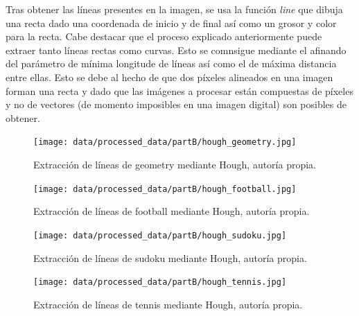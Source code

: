\documentclass[a4paper,12pt]{article}
\begin{document}
{\vspace{0.5cm}

Tras obtener las líneas presentes en la imagen, se usa la función \textit{line} que dibuja una recta dado una coordenada de inicio y de final así como 
un grosor y color para la recta. Cabe destacar que el proceso explicado anteriormente puede extraer tanto líneas rectas como curvas. Esto se comnsigue 
mediante el afinando del parámetro de mínima longitude de líneas así como el de máxima distancia entre ellas. Esto se debe al hecho de que dos píxeles 
alineados en una imagen forman una recta y dado que las imágenes a procesar están compuestas de píxeles y no de vectores (de momento imposibles en una 
imagen digital) son posibles de obtener.

\newpage

\begin{figure}[h!]
    \centering
    \begin{minipage}[b]{0.35\textwidth}
        \centering
        \texttt{[image: data/processed\_data/partB/hough\_geometry.jpg]}
        \caption{Extracción de líneas de geometry mediante Hough, autoría propia.}
        \label{fig:hough-geometry}
    \end{minipage}
    \hfill
    \begin{minipage}[b]{0.45\textwidth}
        \centering
        \texttt{[image: data/processed\_data/partB/hough\_football.jpg]}
        \caption{Extracción de líneas de football mediante Hough, autoría propia.}
        \label{fig:hough-football}
    \end{minipage}

\end{figure}


\begin{figure}[h!]
    \centering
    \begin{minipage}[b]{0.3\textwidth}
        \centering
        \texttt{[image: data/processed\_data/partB/hough\_sudoku.jpg]}
        \caption{Extracción de líneas de sudoku mediante Hough, autoría propia.}
        \label{fig:hough-sudoku}
    \end{minipage}
    \hfill
    \begin{minipage}[b]{0.5\textwidth}
        \centering
        \texttt{[image: data/processed\_data/partB/hough\_tennis.jpg]}
        \caption{Extracción de líneas de tennis mediante Hough, autoría propia.}
        \label{fig:hough-tennis}
    \end{minipage}

\end{figure}

}
\end{document}

